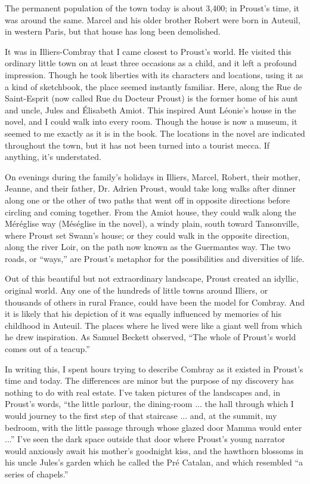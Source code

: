 The permanent population of the town today is about 3,400; in Proust's
time, it was around the same. Marcel and his older brother Robert were
born in Auteuil, in western Paris, but that house has long been
demolished.

It was in Illiers-Combray that I came closest to Proust's world. He
visited this ordinary little town on at least three occasions as a
child, and it left a profound impression. Though he took liberties with
its characters and locations, using it as a kind of sketchbook, the
place seemed instantly familiar. Here, along the Rue de Saint-Esprit
(now called Rue du Docteur Proust) is the former home of his aunt and
uncle, Jules and Élisabeth Amiot. This inspired Aunt Léonie's house in
the novel, and I could walk into every room. Though the house is now a
museum, it seemed to me exactly as it is in the book. The locations in
the novel are indicated throughout the town, but it has not been turned
into a tourist mecca. If anything, it's understated.

On evenings during the family's holidays in Illiers, Marcel, Robert,
their mother, Jeanne, and their father, Dr. Adrien Proust, would take
long walks after dinner along one or the other of two paths that went
off in opposite directions before circling and coming together. From the
Amiot house, they could walk along the Méréglise way (Méséglise in the
novel), a windy plain, south toward Tansonville, where Proust set
Swann's house; or they could walk in the opposite direction, along the
river Loir, on the path now known as the Guermantes way. The two roads,
or ``ways,'' are Proust's metaphor for the possibilities and diversities
of life.

Out of this beautiful but not extraordinary landscape, Proust created an
idyllic, original world. Any one of the hundreds of little towns around
Illiers, or thousands of others in rural France, could have been the
model for Combray. And it is likely that his depiction of it was equally
influenced by memories of his childhood in Auteuil. The places where he
lived were like a giant well from which he drew inspiration. As Samuel
Beckett observed, ``The whole of Proust's world comes out of a teacup.''

In writing this, I spent hours trying to describe Combray as it existed
in Proust's time and today. The differences are minor but the purpose of
my discovery has nothing to do with real estate. I've taken pictures of
the landscapes and, in Proust's words, ``the little parlour, the
dining-room ... the hall through which I would journey to the first step
of that staircase ... and, at the summit, my bedroom, with the little
passage through whose glazed door Mamma would enter ...'' I've seen the
dark space outside that door where Proust's young narrator would
anxiously await his mother's goodnight kiss, and the hawthorn blossoms
in his uncle Jules's garden which he called the Pré Catalan, and which
resembled ``a series of chapels.''

